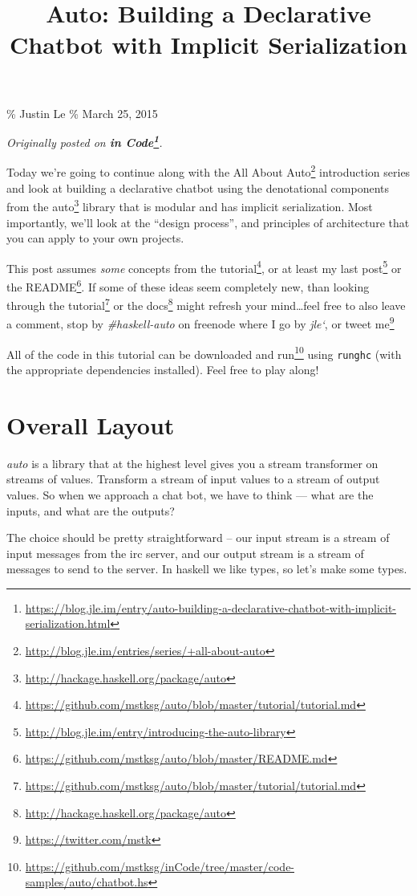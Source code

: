 \documentclass[]{article}
\title{Auto: Building a Declarative Chatbot with Implicit Serialization}
\renewcommand{\href}[2]{#2\footnote{\url{#1}}}
\begin{document}
\maketitle

\% Justin Le \% March 25, 2015

\emph{Originally posted on
\textbf{\href{https://blog.jle.im/entry/auto-building-a-declarative-chatbot-with-implicit-serialization.html}{in
Code}}.}

Today we're going to continue along with the
\href{http://blog.jle.im/entries/series/+all-about-auto}{All About Auto}
introduction series and look at building a declarative chatbot using the
denotational components from the
\href{http://hackage.haskell.org/package/auto}{auto} library that is modular and
has implicit serialization. Most importantly, we'll look at the ``design
process'', and principles of architecture that you can apply to your own
projects.

This post assumes \emph{some} concepts from the
\href{https://github.com/mstksg/auto/blob/master/tutorial/tutorial.md}{tutorial},
or at least my \href{http://blog.jle.im/entry/introducing-the-auto-library}{last
post} or the
\href{https://github.com/mstksg/auto/blob/master/README.md}{README}. If some of
these ideas seem completely new, than looking through the
\href{https://github.com/mstksg/auto/blob/master/tutorial/tutorial.md}{tutorial}
or the \href{http://hackage.haskell.org/package/auto}{docs} might refresh your
mind\ldots feel free to also leave a comment, stop by \emph{\#haskell-auto} on
freenode where I go by \emph{jle`}, or \href{https://twitter.com/mstk}{tweet me}

All of the code in this tutorial can be
\href{https://github.com/mstksg/inCode/tree/master/code-samples/auto/chatbot.hs}{downloaded
and run} using \texttt{runghc} (with the appropriate dependencies installed).
Feel free to play along!

\section{Overall Layout}\label{overall-layout}

\emph{auto} is a library that at the highest level gives you a stream
transformer on streams of values. Transform a stream of input values to a stream
of output values. So when we approach a chat bot, we have to think --- what are
the inputs, and what are the outputs?

The choice should be pretty straightforward -- our input stream is a stream of
input messages from the irc server, and our output stream is a stream of
messages to send to the server. In haskell we like types, so let's make some
types.
\end{document}
